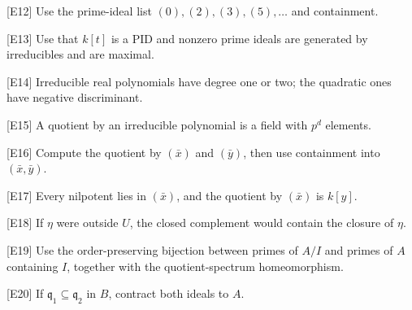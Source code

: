 \begin{hint}
[E12]
Use the prime-ideal list $(0),(2),(3),(5),\dots$ and containment.
\end{hint}

\begin{hint}
[E13]
Use that $k[t]$ is a PID and nonzero prime ideals are generated by irreducibles and are
maximal.
\end{hint}

\begin{hint}
[E14]
Irreducible real polynomials have degree one or two; the quadratic ones have negative
discriminant.
\end{hint}

\begin{hint}
[E15]
A quotient by an irreducible polynomial is a field with $p^d$ elements.
\end{hint}

\begin{hint}
[E16]
Compute the quotient by $(\bar x)$ and $(\bar y)$, then use containment into
$(\bar x,\bar y)$.
\end{hint}

\begin{hint}
[E17]
Every nilpotent lies in $(\bar x)$, and the quotient by $(\bar x)$ is $k[y]$.
\end{hint}

\begin{hint}
[E18]
If $\eta$ were outside $U$, the closed complement would contain the closure of $\eta$.
\end{hint}

\begin{hint}
[E19]
Use the order-preserving bijection between primes of $A/I$ and primes of $A$ containing
$I$, together with the quotient-spectrum homeomorphism.
\end{hint}

\begin{hint}
[E20]
If $\mathfrak q_1\subseteq\mathfrak q_2$ in $B$, contract both ideals to $A$.
\end{hint}
